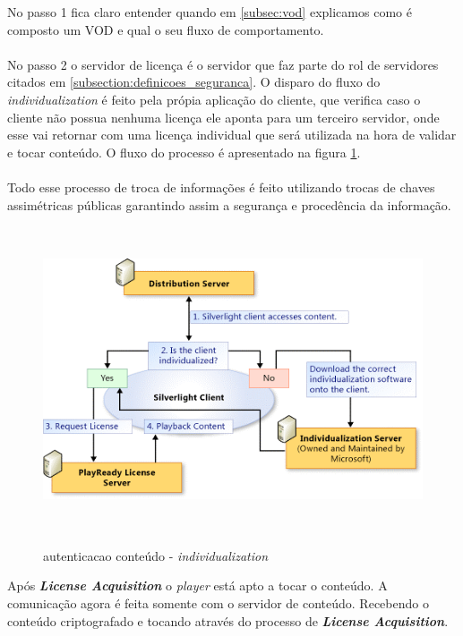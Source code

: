 No passo 1 fica claro entender quando em \ref{subsec:vod} explicamos como \'e composto um VOD e qual o seu fluxo de comportamento.
\paragraph{}
No passo 2 o servidor de licen\c{c}a \'e o servidor que faz parte do rol de servidores citados em \ref{subsection:definicoes_seguranca}. O disparo do fluxo do \textit{individualization} \'e feito pela pr\'opia aplica\c{c}\~ao do cliente, que verifica caso o cliente n\~ao possua nenhuma licen\c{c}a ele aponta para um terceiro servidor, onde esse vai retornar com uma licen\c{c}a individual que ser\'a utilizada na hora de validar e tocar conte\'udo. O fluxo do processo \'e apresentado na figura \ref{figura:individualization}. 
\paragraph{}
Todo esse processo de troca de informa\c{c}\~oes \'e feito utilizando trocas de chaves assim\'etricas p\'ublicas garantindo assim a seguran\c{c}a e proced\^encia da informa\c{c}\~ao.
\begin{figure}[H]
\caption{autenticacao conte\'udo - \textit{individualization}}
\includegraphics[height=9cm]{Figuras/autenticacao_conteudo_individualization.png} 
\label{figura:individualization}
\end{figure}
Ap\'os \textbf{\textit{License Acquisition}} o \textit{player} est\'a apto a tocar o conte\'udo. A comunica\c{c}\~ao agora \'e feita somente com o servidor de conte\'udo. Recebendo o conte\'udo criptografado e tocando atrav\'es do processo de \textbf{\textit{License Acquisition}}.